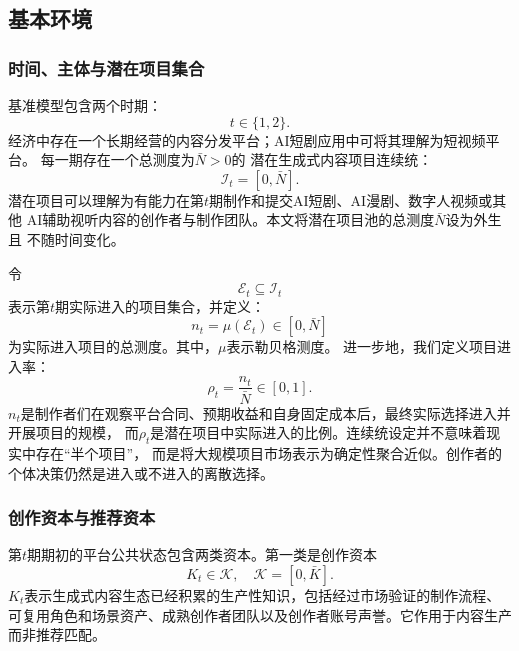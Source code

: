 \documentclass[UTF8, a4paper, 12pt, fontset=fandol]{ctexart}
\theoremstyle{definition}
\theoremstyle{remark}
\begin{document}
\subsection{基本环境}
\subsubsection{时间、主体与潜在项目集合}
基准模型包含两个时期：
\begin{equation*}
  t\in \{1,2\}.
\end{equation*}
经济中存在一个长期经营的内容分发平台；AI短剧应用中可将其理解为短视频平台。
每一期存在一个总测度为$\bar N>0$的
潜在生成式内容项目连续统：
\begin{equation*}
  \mathcal{I}_t = [0,\bar N].
\end{equation*}
潜在项目可以理解为有能力在第$t$期制作和提交AI短剧、AI漫剧、数字人视频或其他
AI辅助视听内容的创作者与制作团队。本文将潜在项目池的总测度$\bar N$设为外生且
不随时间变化。

令
\begin{equation*}
  \mathcal{E}_t \subseteq \mathcal{I}_t
\end{equation*}
表示第$t$期实际进入的项目集合，并定义：
\begin{equation*}
  n_t=\mu(\mathcal{E}_t)\in [0,\bar N]
\end{equation*}
为实际进入项目的总测度。其中，$\mu$表示勒贝格测度。
进一步地，我们定义项目进入率：
\begin{equation*}
  \rho_t = \frac{n_t}{\bar N}\in [0,1].
\end{equation*}
$n_t$是制作者们在观察平台合同、预期收益和自身固定成本后，最终实际选择进入并开展项目的规模，
而$\rho_t$是潜在项目中实际进入的比例。连续统设定并不意味着现实中存在“半个项目”，
而是将大规模项目市场表示为确定性聚合近似。创作者的个体决策仍然是进入或不进入的离散选择。

\subsubsection{创作资本与推荐资本}
第$t$期期初的平台公共状态包含两类资本。第一类是创作资本
\begin{equation*}
  K_t \in \mathcal{K},\quad \mathcal{K}=[0,\bar K].
\end{equation*}
$K_t$表示生成式内容生态已经积累的生产性知识，包括经过市场验证的制作流程、
可复用角色和场景资产、成熟创作者团队以及创作者账号声誉。它作用于内容生产
而非推荐匹配。
\end{document}

